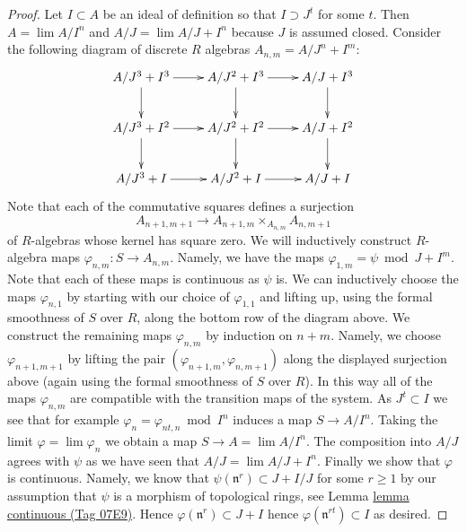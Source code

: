 \documentclass{amsart}
\theoremstyle{plain}
\theoremstyle{definition}
\theoremstyle{remark}
\numberwithin{equation}{subsection}
\def\lim{\mathop{\mathrm{lim}}\nolimits}
\begin{document}
\begin{proof}
Let $I \subset A$ be an ideal of definition so that $I \supset J^t$
for some $t$. Then $A = \lim A/I^n$ and $A/J = \lim A/J + I^n$
because $J$ is assumed closed. Consider the following diagram of
discrete $R$ algebras $A_{n, m} = A/J^n + I^m$:
$$
\xymatrix{
A/J^3 + I^3 \ar[r] \ar[d] &
A/J^2 + I^3 \ar[r] \ar[d] &
A/J + I^3 \ar[d] \\
A/J^3 + I^2 \ar[r] \ar[d] &
A/J^2 + I^2 \ar[r] \ar[d] &
A/J + I^2 \ar[d] \\
A/J^3 + I \ar[r] &
A/J^2 + I \ar[r] &
A/J + I
}
$$
Note that each of the commutative squares defines a surjection
$$
A_{n + 1, m + 1} \longrightarrow A_{n + 1, m} \times_{A_{n, m}} A_{n, m + 1}
$$
of $R$-algebras whose kernel has square zero.
We will inductively construct $R$-algebra maps
$\varphi_{n, m} : S \to A_{n, m}$.
Namely, we have the maps $\varphi_{1, m} = \psi \bmod J + I^m$.
Note that each of these maps is continuous as $\psi$ is.
We can inductively choose the maps $\varphi_{n, 1}$ by starting
with our choice of $\varphi_{1, 1}$ and lifting up, using the
formal smoothness of $S$ over $R$, along the bottom row of the
diagram above. We construct the remaining maps $\varphi_{n, m}$
by induction on $n + m$. Namely, we choose $\varphi_{n + 1, m + 1}$
by lifting the pair $(\varphi_{n + 1, m}, \varphi_{n, m + 1})$
along the displayed surjection above (again using the formal smoothness
of $S$ over $R$). In this way all of the maps $\varphi_{n, m}$ are
compatible with the transition maps of the system.
As $J^t \subset I$ we see that for example
$\varphi_n = \varphi_{nt, n} \bmod I^n$ induces a map $S \to A/I^n$.
Taking the limit $\varphi = \lim \varphi_n$ we obtain a map
$S \to A = \lim A/I^n$. The composition into $A/J$ agrees
with $\psi$ as we have seen that $A/J = \lim A/J + I^n$.
Finally we show that $\varphi$ is continuous. Namely, we know that
$\psi(\mathfrak n^r) \subset J + I/J$ for some $r \geq 1$ by our
assumption that $\psi$ is a morphism of topological rings, see
Lemma \href{https://stacks.math.columbia.edu/tag/07E9}{lemma continuous (Tag 07E9)}. Hence $\varphi(\mathfrak n^r) \subset J + I$
hence $\varphi(\mathfrak n^{rt}) \subset I$ as desired.
\end{proof}
\end{document}
